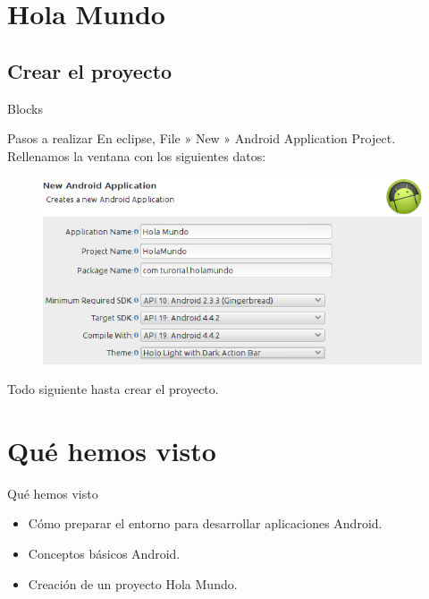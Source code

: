 \documentclass{beamer}
\begin{document}
\section{Hola Mundo}

\subsection{Crear el proyecto}

\begin{frame}{Blocks}
\begin{block}{Pasos a realizar}
En eclipse, File » New » Android Application Project. Rellenamos la ventana con los siguientes datos:

\begin{figure}[H]
\centering
\includegraphics[scale=.25]{./img/holamundo.png}
\end{figure}
Todo siguiente hasta crear el proyecto.
\end{block}
\end{frame}

\section*{Qué hemos visto}

\begin{frame}{Qué hemos visto}
  \begin{itemize}
  \item
    Cómo preparar el entorno para desarrollar aplicaciones Android.
  \item
    Conceptos básicos Android.
  \item
    Creación de un proyecto Hola Mundo.
  \end{itemize}
\end{frame}
\end{document}
